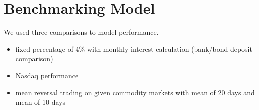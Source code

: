 \documentclass[final,2p]{elsarticle}
\begin{document}

\section{Benchmarking Model}

We used three comparisons to model performance.

\begin{itemize}
    \item fixed percentage of 4\% with monthly interest calculation (bank/bond deposit comparison)
    \item Nasdaq performance
    \item mean reversal trading on given commodity markets with mean of 20 days and mean of 10 days
\end{itemize}
\end{document}
